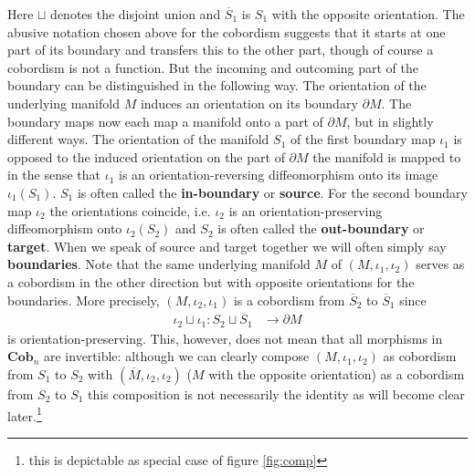 Here $\sqcup$ denotes the disjoint union and $\overline{S}_{1}$ is $S_{1}$ with the opposite orientation. The abusive notation chosen above for the cobordism suggests that it starts at one part of its boundary and transfers this to the other part, though of course a cobordism is not a function. But the incoming and outcoming part of the boundary can be distinguished in the following way. The orientation of the underlying manifold $M$ induces an orientation on its boundary $\partial M$. The boundary maps now each map a manifold onto a part of $\partial M$, but in slightly different ways. The orientation of the manifold $S_{1}$ of the first boundary map $\iota_{1}$ is opposed to the induced orientation on the part of $\partial M$ the manifold is mapped to in the sense that $\iota_{1}$ is an orientation-reversing diffeomorphism onto its image $\iota_{1}(S_{1})$. $S_{1}$ is often called the \textbf{in-boundary} or \textbf{source}. For the second boundary map $\iota_{2}$ the orientations coincide, i.e. $\iota_{2}$ is an orientation-preserving diffeomorphism onto $\iota_{2}(S_{2})$ and $S_{2}$ is often called the \textbf{out-boundary} or \textbf{target}. When we speak of source and target together we will often simply say \textbf{boundaries}. Note that the same underlying manifold $M$ of $(M,\iota_{1},\iota_{2})$ serves as a cobordism in the other direction but with opposite orientations for the boundaries. More precisely, $(M,\iota_{2},\iota_{1})$ is a cobordism from $\overline{S}_{2}$ to $\overline{S}_{1}$ since
\begin{align*}
  \iota_{2}
  \sqcup
  \iota_{1}
  \colon
  S_{2}
  \sqcup
  \overline{S}_{1}
  &\to
  \partial M
\end{align*}
is orientation-preserving. This, however, does not mean that all morphisms in $\mathbf{Cob}_{n}$ are invertible: although we can clearly compose $(M,\iota_{1},\iota_{2})$ as cobordism from $S_{1}$ to $S_{2}$ with $(\overline{M},\iota_{2},\iota_{2})$ ($M$ with the opposite orientation) as a cobordism from $S_{2}$ to $S_{1}$ this composition is not necessarily the identity as will become clear later.\footnote{this is depictable as special case of figure \ref{fig:comp}}
\\
